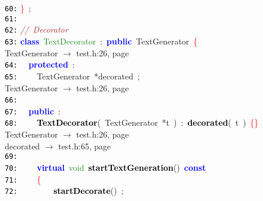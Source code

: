 \documentclass{article}
\begin{document}
\mbox{}\texttt{\textcolor{Black}{60:}} \textcolor{Red}{\}}\ \textcolor{BrickRed}{;} \\
\mbox{}\texttt{\textcolor{Black}{61:}}  \\
\mbox{}\texttt{\textcolor{Black}{62:}} \textit{\textcolor{Brown}{//\ Decorator}} \\
\mbox{}\texttt{\textcolor{Black}{63:}} \textbf{\textcolor{Blue}{class}}\ \textcolor{ForestGreen}{\label{test.h:63}TextDecorator}\ \textcolor{BrickRed}{:}\ \textbf{\textcolor{Blue}{public}}\ TextGenerator\ \textcolor{Red}{\{} \\
\mbox{}{\hfill TextGenerator $\rightarrow$ test.h:26, page~\pageref{test.h:26}} \\
\mbox{}\texttt{\textcolor{Black}{64:}} \ \ \textbf{\textcolor{Blue}{protected}}\ \textcolor{BrickRed}{:} \\
\mbox{}\texttt{\textcolor{Black}{65:}} \ \ \ \ TextGenerator\ \textcolor{BrickRed}{*}\label{test.h:65}decorated\ \textcolor{BrickRed}{;} \\
\mbox{}{\hfill TextGenerator $\rightarrow$ test.h:26, page~\pageref{test.h:26}} \\
\mbox{}\texttt{\textcolor{Black}{66:}} \ \  \\
\mbox{}\texttt{\textcolor{Black}{67:}} \ \ \textbf{\textcolor{Blue}{public}}\ \textcolor{BrickRed}{:} \\
\mbox{}\texttt{\textcolor{Black}{68:}} \ \ \ \ \textbf{\textcolor{Black}{\label{test.h:68}TextDecorator}}\textcolor{BrickRed}{(}\ TextGenerator\ \textcolor{BrickRed}{*}t\ \textcolor{BrickRed}{)}\ \textcolor{BrickRed}{:}\ \textbf{\textcolor{Black}{decorated}}\textcolor{BrickRed}{(}\ t\ \textcolor{BrickRed}{)}\ \textcolor{Red}{\{\}} \\
\mbox{}{\hfill TextGenerator $\rightarrow$ test.h:26, page~\pageref{test.h:26}} \\
\mbox{}{\hfill decorated $\rightarrow$ test.h:65, page~\pageref{test.h:65}} \\
\mbox{}\texttt{\textcolor{Black}{69:}}  \\
\mbox{}\texttt{\textcolor{Black}{70:}} \ \ \ \ \textbf{\textcolor{Blue}{virtual}}\ \textcolor{ForestGreen}{void}\ \textbf{\textcolor{Black}{\label{test.h:70}startTextGeneration}}\textcolor{BrickRed}{()}\ \textbf{\textcolor{Blue}{const}}\  \\
\mbox{}\texttt{\textcolor{Black}{71:}} \ \ \ \ \textcolor{Red}{\{}\  \\
\mbox{}\texttt{\textcolor{Black}{72:}} \ \ \ \ \ \ \ \ \textbf{\textcolor{Black}{startDecorate}}\textcolor{BrickRed}{()}\ \textcolor{BrickRed}{;} \\
\end{document}
